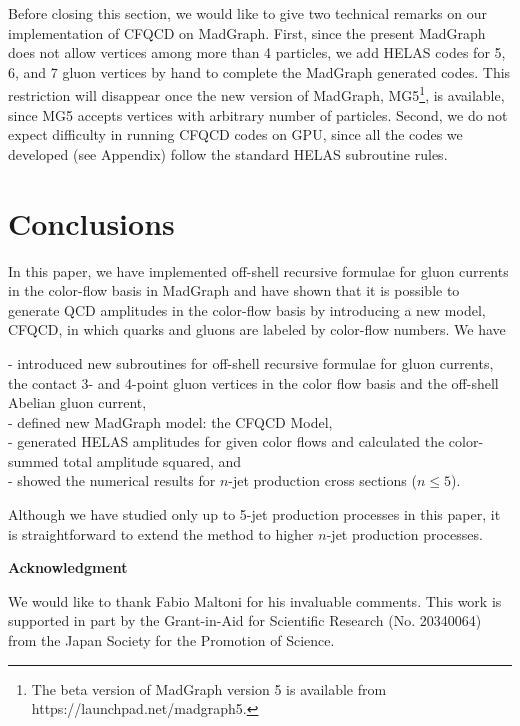   Before closing this section, we would like to give two
 technical remarks on our implementation of CFQCD on MadGraph.
 First, since the present MadGraph\cite{MG/ME} does not allow vertices
 among more than 4 particles, we add HELAS codes for 5, 6,
 and 7 gluon vertices by hand to complete the MadGraph
 generated codes.
 This restriction will disappear once the new version of
 MadGraph, MG5\footnote{The beta version of MadGraph version 5 is
 available from https://launchpad.net/madgraph5.},
 is available, since MG5 accepts
 vertices with arbitrary number of particles.
 Second, we do not expect difficulty in running CFQCD codes
 on GPU, since all the codes we developed (see Appendix)
 follow the standard HELAS subroutine rules.

\section{Conclusions}
\label{conclusion}
 In this paper, we have implemented off-shell recursive
 formulae for gluon currents in the color-flow basis in MadGraph and have
 shown that it is possible to generate QCD amplitudes
 in the color-flow basis by introducing a new model,
 CFQCD, in which quarks and gluons are labeled by
 color-flow numbers.
 We have

 \noindent
 - introduced new subroutines for off-shell recursive
 formulae for gluon currents, the contact 3- and 4-point gluon vertices
 in the color flow basis and the off-shell Abelian gluon current,\\
 - defined new MadGraph model: the CFQCD Model,\\
 - generated HELAS amplitudes for given color flows
 and calculated the color-summed total amplitude squared,
 and \\
 - showed the numerical results for $n$-jet production
 cross sections ($n\leq 5$).

 Although we have studied only up to 5-jet production processes in this paper, it is straightforward to extend
 the method to higher $n$-jet production processes.

\vspace{3em}
\begin{center}
{\bf Acknowledgment}
\end{center}
We would like to thank Fabio Maltoni for his invaluable comments.  This work is supported in part by
 the Grant-in-Aid for Scientific Research (No. 20340064)
 from the Japan Society for the Promotion of Science.\\

